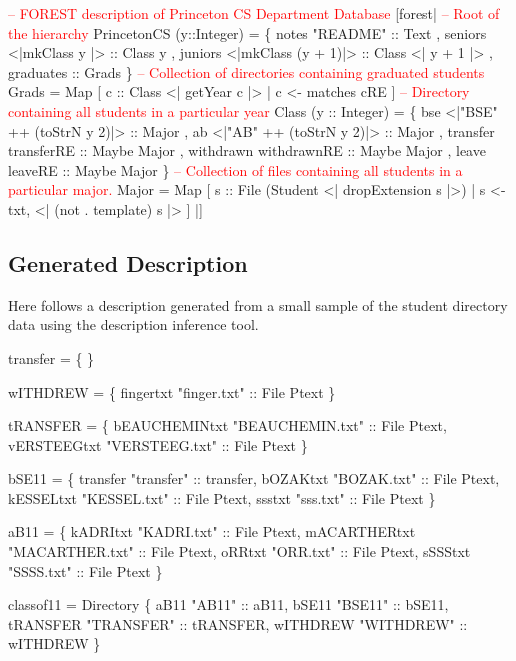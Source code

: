 \begin{code}
\textcolor{red}{-- FOREST description of Princeton CS Department Database}
[forest|
  \textcolor{red}{-- Root of the hierarchy}
   PrincetonCS (y::Integer) = 
    \{ notes  "README" :: Text
    , seniors    <|mkClass y      |> :: Class y
    , juniors    <|mkClass (y + 1)|> :: Class <| y + 1 |>
    , graduates :: Grads
    \}
\mbox{}
  \textcolor{red}{-- Collection of directories containing graduated students}
   Grads = 
     Map [ c :: Class <| getYear c |> | c <- matches cRE ] 
\mbox{}
  \textcolor{red}{-- Directory containing all students in a particular year}
   Class (y :: Integer) = 
    \{ bse  <|"BSE" ++ (toStrN y 2)|> :: Major
    , ab   <|"AB"  ++ (toStrN y 2)|> :: Major   
    , transfer   transferRE  :: Maybe Major 
    , withdrawn  withdrawnRE :: Maybe Major 
    , leave      leaveRE     :: Maybe Major 
    \}
\mbox{}
  \textcolor{red}{-- Collection of files containing all students in a particular major.}
   Major = Map 
    [ s :: File (Student <| dropExtension s |>) 
    | s <-  txt,  <| (not . template) s |>  ]  
|]
\end{code}
\vfill{}

\subsection{Generated Description}

Here follows a description generated from a small sample of the
student directory data using the description inference tool.

\begin{code}
 transfer =  \{
\}

 wITHDREW =  \{
    fingertxt  "finger.txt" :: File Ptext
\}

 tRANSFER =  \{
    bEAUCHEMINtxt  "BEAUCHEMIN.txt" :: File Ptext,
    vERSTEEGtxt  "VERSTEEG.txt" :: File Ptext
\}

 bSE11 =  \{
    transfer  "transfer" :: transfer,
    bOZAKtxt  "BOZAK.txt" :: File Ptext,
    kESSELtxt  "KESSEL.txt" :: File Ptext,
    ssstxt  "sss.txt" :: File Ptext
\}

 aB11 =  \{
    kADRItxt  "KADRI.txt" :: File Ptext,
    mACARTHERtxt  "MACARTHER.txt" :: File Ptext,
    oRRtxt  "ORR.txt" :: File Ptext,
    sSSStxt  "SSSS.txt" :: File Ptext
\}

 classof11 = Directory \{
    aB11  "AB11" :: aB11,
    bSE11  "BSE11" :: bSE11,
    tRANSFER  "TRANSFER" :: tRANSFER,
    wITHDREW  "WITHDREW" :: wITHDREW
\}
\end{code}
